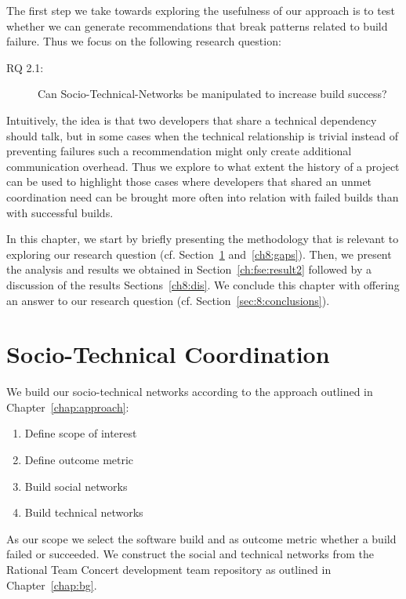 \label{chap:stc-net}
The first step we take towards exploring the usefulness of our approach is to test whether we can generate recommendations that break patterns related to build failure.
Thus we focus on the following research question:

\begin{description}
  \item[RQ 2.1:] Can Socio-Technical-Networks be manipulated to increase build success? 
\end{description}

Intuitively, the idea is that two developers that share a technical dependency should talk, but in some cases when the technical relationship is trivial instead of preventing failures such a recommendation might only create additional communication overhead.
Thus we explore to what extent the history of a project can be used to highlight those cases where developers that shared an unmet coordination need can be brought more often into relation with failed builds than with successful builds.

In this chapter, we start by briefly presenting the methodology that is relevant to exploring our research question (cf. Section~\ref{sec:data} and~\ref{ch8:gaps}).
Then, we present the analysis and results we obtained in Section~\ref{ch:fse:result2} followed by a discussion of the results Sections~\ref{ch8:dis}.
We conclude this chapter with offering an answer to our research question (cf. Section~\ref{sec:8:conclusions}).


\section{Socio-Technical Coordination}
\label{sec:data}
We build our socio-technical networks according to the approach outlined in Chapter~\ref{chap:approach}:

\begin{enumerate}
\item Define scope of interest
\item Define outcome metric
\item Build social networks
\item Build technical networks
\end{enumerate}

As our scope we select the software build and as outcome metric whether a build failed or succeeded.
We construct the social and technical networks from the Rational Team Concert development team repository as outlined in Chapter~\ref{chap:bg}.


